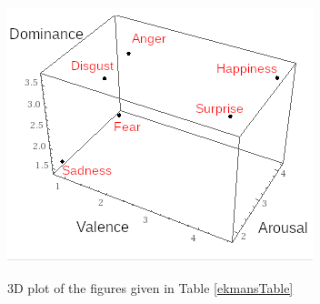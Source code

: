 \begin{figure}[ht]
\centering
\includegraphics[scale=2]{litImgs/Ekmans3d.png}
\label{ekmans:graph}
\caption{3D plot of the figures given in Table \ref{ekmansTable}}
\end{figure}

